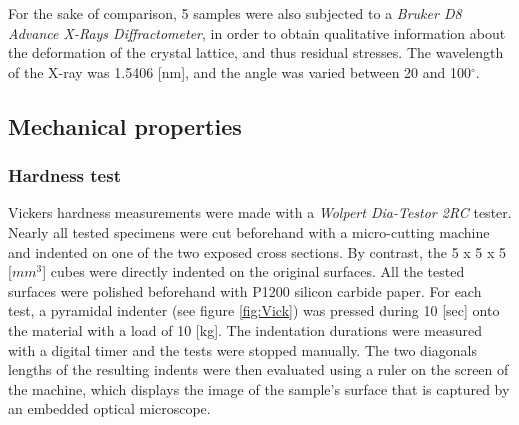For the sake of comparison, 5 samples were also subjected to a \textit{Bruker D8 Advance X-Rays Diffractometer}, in order to obtain qualitative information about the deformation of the crystal lattice, and thus residual stresses. The wavelength of the X-ray was 1.5406 [nm], and the angle was varied between 20 and 100$^\circ$.\\

\subsection{Mechanical properties}

\subsubsection{Hardness test}


Vickers hardness measurements were made with a \textit{Wolpert Dia-Testor 2RC} tester. Nearly all tested specimens were cut beforehand with a micro-cutting machine and indented on one of the two exposed cross sections. By contrast, the 5 x 5 x 5 [$mm^3$] cubes were directly indented on the original surfaces. All the tested surfaces were polished beforehand with P1200 silicon carbide paper. For each test, a pyramidal indenter (see figure \ref{fig:Vick}) was pressed during 10 [sec] onto the material with a load of 10 [kg]. The indentation durations were measured with a digital timer and the tests were stopped manually. The two diagonals lengths of the resulting indents were then evaluated using a ruler on the screen of the machine, which displays the image of the sample's surface that is captured by an embedded optical microscope.\\

